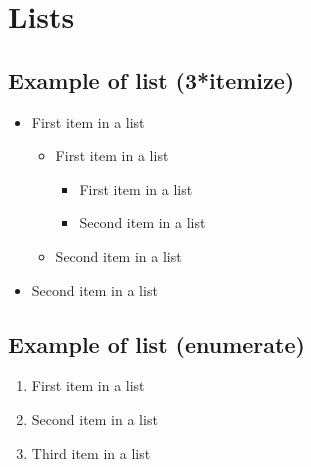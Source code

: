 \documentclass[paper=a4, fontsize=11pt]{scrartcl}
\numberwithin{equation}{section}
\numberwithin{figure}{section}
\numberwithin{table}{section}
\begin{document}
\section{Lists}


\subsection{Example of list (3*itemize)}
\begin{itemize}
	\item First item in a list 
		\begin{itemize}
		\item First item in a list 
			\begin{itemize}
			\item First item in a list 
			\item Second item in a list 
			\end{itemize}
		\item Second item in a list 
		\end{itemize}
	\item Second item in a list 
\end{itemize}


\subsection{Example of list (enumerate)}
\begin{enumerate}
\item First item in a list 
\item Second item in a list 
\item Third item in a list
\end{enumerate}

\end{document}
